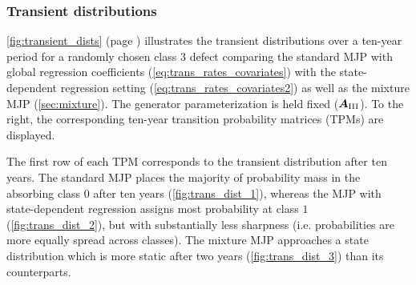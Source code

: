\subsubsection{Transient distributions}

\cref{fig:transient_dists} (page \pageref{fig:transient_dists}) illustrates the transient distributions over a ten-year period for a randomly chosen class $3$ defect
comparing the standard MJP with global regression coefficients (\cref{eq:trans_rates_covariates}) with the state-dependent regression setting (\cref{eq:trans_rates_covariates2}) as well as the mixture MJP (\cref{sec:mixture}). The generator parameterization is held fixed ($\bm{A}_{\RN{3}}$). To the right, the corresponding ten-year transition probability matrices (TPMs) are displayed.



The first row of each TPM corresponds to the transient distribution after ten years. 
The standard MJP places the majority of probability mass in the absorbing class $0$ after ten years (\cref{fig:trans_dist_1}), whereas the MJP with state-dependent regression assigns most probability at class $1$ (\cref{fig:trans_dist_2}), but with substantially less sharpness (i.e. probabilities are more equally spread across classes). The mixture MJP approaches a state distribution which is more static after two years (\cref{fig:trans_dist_3}) than its counterparts.

